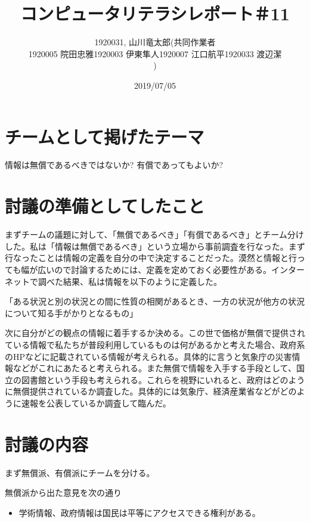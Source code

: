 \documentclass[12pt,a4j]{jarticle}
\begin{document}
\title{コンピュータリテラシレポート＃11}
\author{1920031, 山川竜太郎(共同作業者 

\begin{itemize}
\item 1920005 院田忠雅 
\item1920003 伊東隼人
\item 1920007 江口航平
\item 1920033 渡辺潔
\end{itemize}

)}
\date{2019/07/05}
\maketitle

\section{チームとして掲げたテーマ}
情報は無償であるべきではないか? 有償であってもよいか?

\section{討議の準備としてしたこと}
まずチームの議題に対して、「無償であるべき」「有償であるべき」とチーム分けした。私は「情報は無償であるべき」という立場から事前調査を行なった。まず行なったことは情報の定義を自分の中で決定することだった。漠然と情報と行っても幅が広いので討論するためには、定義を定めておく必要性がある。インターネットで調べた結果、私は情報を以下のように定義した。

「ある状況と別の状況との間に性質の相関があるとき、一方の状況が他方の状況について知る手がかりとなるもの」

次に自分がどの観点の情報に着手するか決める。この世で価格が無償で提供されている情報で私たちが普段利用しているものは何があるかと考えた場合、政府系のHPなどに記載されている情報が考えられる。具体的に言うと気象庁の災害情報などがこれにあたると考えられる。また無償で情報を入手する手段として、国立の図書館という手段も考えられる。これらを視野にいれると、政府はどのように無償提供されているか調査した。具体的には気象庁、経済産業省などがどのように速報を公表しているか調査して臨んだ。

\section{討議の内容}
まず無償派、有償派にチームを分ける。

無償派から出た意見を次の通り

\begin{itemize}
\item 学術情報、政府情報は国民は平等にアクセスできる権利がある。
\end{itemize}
\end{document}
